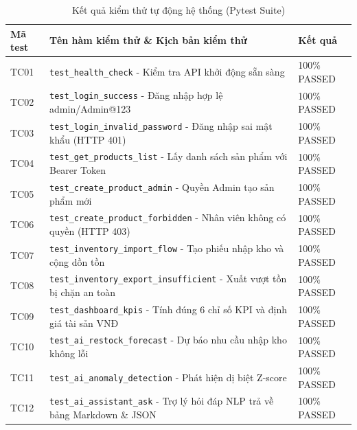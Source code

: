 \begin{table}[htbp]
\centering
\small
\caption{Kết quả kiểm thử tự động hệ thống (Pytest Suite)}
\label{tab:tests}
\begin{tabularx}{\textwidth}{lXl}
\toprule
\textbf{Mã test} & \textbf{Tên hàm kiểm thử \& Kịch bản kiểm thử} & \textbf{Kết quả} \\
\midrule
TC01 & \texttt{test\_health\_check} - Kiểm tra API khởi động sẵn sàng & 100\% PASSED \\
TC02 & \texttt{test\_login\_success} - Đăng nhập hợp lệ admin/Admin@123 & 100\% PASSED \\
TC03 & \texttt{test\_login\_invalid\_password} - Đăng nhập sai mật khẩu (HTTP 401) & 100\% PASSED \\
TC04 & \texttt{test\_get\_products\_list} - Lấy danh sách sản phẩm với Bearer Token & 100\% PASSED \\
TC05 & \texttt{test\_create\_product\_admin} - Quyền Admin tạo sản phẩm mới & 100\% PASSED \\
TC06 & \texttt{test\_create\_product\_forbidden} - Nhân viên không có quyền (HTTP 403) & 100\% PASSED \\
TC07 & \texttt{test\_inventory\_import\_flow} - Tạo phiếu nhập kho và cộng dồn tồn & 100\% PASSED \\
TC08 & \texttt{test\_inventory\_export\_insufficient} - Xuất vượt tồn bị chặn an toàn & 100\% PASSED \\
TC09 & \texttt{test\_dashboard\_kpis} - Tính đúng 6 chỉ số KPI và định giá tài sản VNĐ & 100\% PASSED \\
TC10 & \texttt{test\_ai\_restock\_forecast} - Dự báo nhu cầu nhập kho không lỗi & 100\% PASSED \\
TC11 & \texttt{test\_ai\_anomaly\_detection} - Phát hiện dị biệt Z-score & 100\% PASSED \\
TC12 & \texttt{test\_ai\_assistant\_ask} - Trợ lý hỏi đáp NLP trả về bảng Markdown \& JSON & 100\% PASSED \\
\bottomrule
\end{tabularx}
\end{table}
